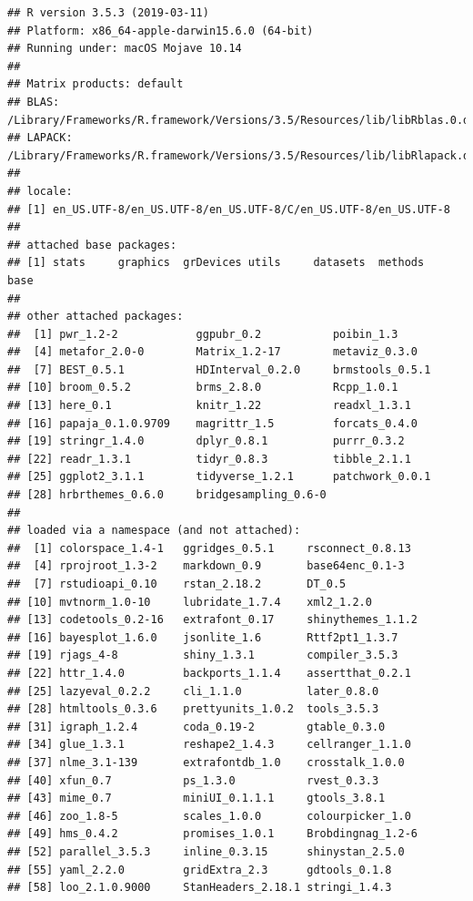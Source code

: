\documentclass[floatsintext,doc]{apa6}
\begin{document}
\begin{verbatim}
## R version 3.5.3 (2019-03-11)
## Platform: x86_64-apple-darwin15.6.0 (64-bit)
## Running under: macOS Mojave 10.14
## 
## Matrix products: default
## BLAS: /Library/Frameworks/R.framework/Versions/3.5/Resources/lib/libRblas.0.dylib
## LAPACK: /Library/Frameworks/R.framework/Versions/3.5/Resources/lib/libRlapack.dylib
## 
## locale:
## [1] en_US.UTF-8/en_US.UTF-8/en_US.UTF-8/C/en_US.UTF-8/en_US.UTF-8
## 
## attached base packages:
## [1] stats     graphics  grDevices utils     datasets  methods   base     
## 
## other attached packages:
##  [1] pwr_1.2-2            ggpubr_0.2           poibin_1.3          
##  [4] metafor_2.0-0        Matrix_1.2-17        metaviz_0.3.0       
##  [7] BEST_0.5.1           HDInterval_0.2.0     brmstools_0.5.1     
## [10] broom_0.5.2          brms_2.8.0           Rcpp_1.0.1          
## [13] here_0.1             knitr_1.22           readxl_1.3.1        
## [16] papaja_0.1.0.9709    magrittr_1.5         forcats_0.4.0       
## [19] stringr_1.4.0        dplyr_0.8.1          purrr_0.3.2         
## [22] readr_1.3.1          tidyr_0.8.3          tibble_2.1.1        
## [25] ggplot2_3.1.1        tidyverse_1.2.1      patchwork_0.0.1     
## [28] hrbrthemes_0.6.0     bridgesampling_0.6-0
## 
## loaded via a namespace (and not attached):
##  [1] colorspace_1.4-1   ggridges_0.5.1     rsconnect_0.8.13  
##  [4] rprojroot_1.3-2    markdown_0.9       base64enc_0.1-3   
##  [7] rstudioapi_0.10    rstan_2.18.2       DT_0.5            
## [10] mvtnorm_1.0-10     lubridate_1.7.4    xml2_1.2.0        
## [13] codetools_0.2-16   extrafont_0.17     shinythemes_1.1.2 
## [16] bayesplot_1.6.0    jsonlite_1.6       Rttf2pt1_1.3.7    
## [19] rjags_4-8          shiny_1.3.1        compiler_3.5.3    
## [22] httr_1.4.0         backports_1.1.4    assertthat_0.2.1  
## [25] lazyeval_0.2.2     cli_1.1.0          later_0.8.0       
## [28] htmltools_0.3.6    prettyunits_1.0.2  tools_3.5.3       
## [31] igraph_1.2.4       coda_0.19-2        gtable_0.3.0      
## [34] glue_1.3.1         reshape2_1.4.3     cellranger_1.1.0  
## [37] nlme_3.1-139       extrafontdb_1.0    crosstalk_1.0.0   
## [40] xfun_0.7           ps_1.3.0           rvest_0.3.3       
## [43] mime_0.7           miniUI_0.1.1.1     gtools_3.8.1      
## [46] zoo_1.8-5          scales_1.0.0       colourpicker_1.0  
## [49] hms_0.4.2          promises_1.0.1     Brobdingnag_1.2-6 
## [52] parallel_3.5.3     inline_0.3.15      shinystan_2.5.0   
## [55] yaml_2.2.0         gridExtra_2.3      gdtools_0.1.8     
## [58] loo_2.1.0.9000     StanHeaders_2.18.1 stringi_1.4.3     

\end{verbatim}
\end{document}
